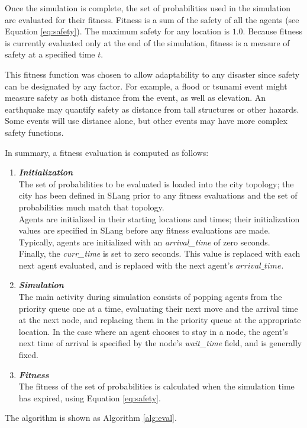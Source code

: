 \documentclass{sig-alternate-05-2015}
\begin{document}
Once the simulation is complete, the set of probabilities used in the
simulation are evaluated for their fitness.  Fitness is a sum of the
safety of all the agents (see Equation \ref{eq:safety}).  The maximum
safety for any location is $1.0$.  Because fitness is currently
evaluated only at the end of the simulation, fitness is a measure of
safety at a specified time $t$.

This fitness function was chosen to allow adaptability to any disaster
since safety can be designated by any factor.  For example, a flood or
tsunami event might measure safety as both distance from the event, as
well as elevation.  An earthquake may quantify safety as distance from
tall structures or other hazards.  Some events will use distance
alone, but other events may have more complex safety functions.

In summary, a fitness evaluation is computed as follows:
\begin{enumerate}
\item \textbf{\textit{Initialization}}\\ The set of probabilities to
  be evaluated is loaded into the city topology; the city has been
  defined in SLang prior to any fitness evaluations and the set of
  probabilities much match that topology.\\ Agents are initialized in
  their starting locations and times; their initialization values are
  specified in SLang before any fitness evaluations are made.
  Typically, agents are initialized with an \emph{arrival\_time} of
  zero seconds.\\ Finally, the \emph{curr\_time} is set to zero
  seconds.  This value is replaced with each next agent evaluated, and
  is replaced with the next agent's $arrival\_time$.
\item \textbf{\textit{Simulation}}\\ The main activity during
  simulation consists of popping agents from the priority queue one at
  a time, evaluating their next move and the arrival time at the next
  node, and replacing them in the priority queue at the appropriate
  location.  In the case where an agent chooses to stay in a node, the
  agent's next time of arrival is specified by the node's
  \emph{wait\_time} field, and is generally fixed.
\item \textbf{\textit{Fitness}}\\ The fitness of the set of
  probabilities is calculated when the simulation time has expired,
  using Equation \ref{eq:safety}.
\end{enumerate}
The algorithm is shown as Algorithm \ref{alg:eval}.
\end{document}
